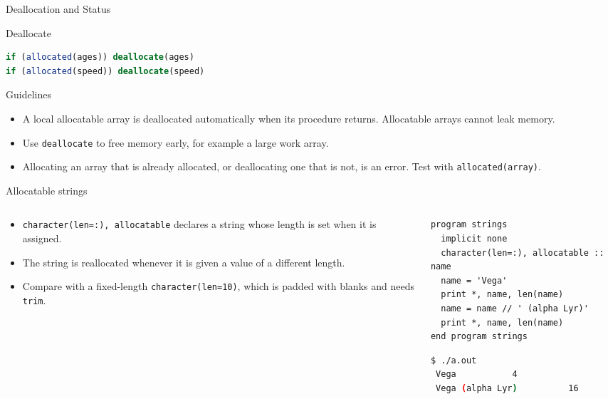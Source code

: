 \begin{frame}[fragile]{Deallocation and Status}
 \begin{block}{Deallocate}
\begin{lstlisting}[language=Fortran]
if (allocated(ages)) deallocate(ages)
if (allocated(speed)) deallocate(speed)
\end{lstlisting}
 \end{block}
 \begin{block}{Guidelines}
   \begin{itemize}
     \item A local allocatable array is deallocated automatically when its procedure returns. Allocatable arrays cannot leak memory.
     \item Use \texttt{deallocate} to free memory early, for example a large work array.
     \item Allocating an array that is already allocated, or deallocating one that is not, is an error. Test with \texttt{allocated(array)}.
   \end{itemize}
 \end{block}
\end{frame}


\begin{frame}[fragile]{Allocatable strings}
  \begin{columns}[T]
    \begin{column}{0.45\textwidth}
      \begin{itemize}
        \item \texttt{character(len=:), allocatable} declares a string whose length is set when it is assigned.
        \item The string is reallocated whenever it is given a value of a different length.
        \item Compare with a fixed-length \texttt{character(len=10)}, which is padded with blanks and needs \texttt{trim}.
      \end{itemize}
    \end{column}

    \begin{column}{0.55\textwidth}
      \begin{lstlisting}
program strings
  implicit none
  character(len=:), allocatable :: name
  name = 'Vega'
  print *, name, len(name)
  name = name // ' (alpha Lyr)'
  print *, name, len(name)
end program strings
      \end{lstlisting}
      \begin{lstlisting}[language=bash]
$ ./a.out
 Vega           4
 Vega (alpha Lyr)          16
      \end{lstlisting}
    \end{column}
  \end{columns}
\end{frame}



